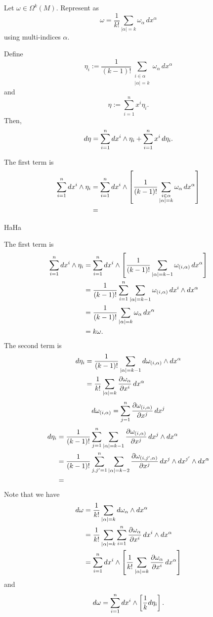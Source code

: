 \documentclass{../exp}
\begin{document}
\begin{pf}
Let $\omega\in\Omega^k(M)$.
Represent as
\[\omega=\frac1{k!}\sum_{|\alpha|=k}\omega_\alpha\,dx^\alpha\]
using multi-indices $\alpha$.

\clearpage
Define
\[\eta_i:=\frac1{(k-1)!}\sum_{\substack{i\in\alpha\\|\alpha|=k}}\omega_\alpha\,dx^\alpha\]
and
\[\eta:=\sum_{i=1}^nx^i\eta_i.\]
Then,
\[d\eta=\sum_{i=1}^ndx^i\wedge\eta_i+\sum_{i=1}^nx^i\,d\eta_i.\]

The first term is
\begin{align*}
\sum_{i=1}^ndx^i\wedge\eta_i
&=\sum_{i=1}^ndx^i\wedge\left[\frac1{(k-1)!}\sum_{\substack{i\in\alpha\\|\alpha|=k}}\omega_\alpha\,dx^\alpha\right]\\
&=
\end{align*}

HaHa

The first term is
\begin{align*}
\sum_{i=1}^ndx^i\wedge\eta_i
&=\sum_{i=1}^ndx^i\wedge\left[\frac1{(k-1)!}\sum_{|\alpha|=k-1}\omega_{(i,\alpha)}\,dx^\alpha\right]\\
&=\frac1{(k-1)!}\sum_{i=1}^n\sum_{|\alpha|=k-1}\omega_{(i,\alpha)}\,dx^i\wedge dx^\alpha\\
&=\frac1{(k-1)!}\sum_{|\alpha|=k}\omega_\alpha\,dx^\alpha\\
&=k\omega.
\end{align*}
The second term is
\begin{align*}
d\eta_i
&=\frac1{(k-1)!}\sum_{|\alpha|=k-1}d\omega_{(i,\alpha)}\wdg dx^\alpha\\
&=\frac1{k!}\sum_{|\alpha|=k}\pd{\omega_\alpha}{x^i}\,dx^\alpha
\end{align*}
\[d\omega_{(i,\alpha)}=\sum_{j=1}^n\pd{\omega_{(i,\alpha)}}{x^j}\,dx^j\]
\begin{align*}
d\eta_i
&=\frac1{(k-1)!}\sum_{j=1}^n\sum_{|\alpha|=k-1}\pd{\omega_{(i,\alpha)}}{x^j}\,dx^j\wdg dx^\alpha\\
&=\frac1{(k-1)!}\sum_{j,j'=1}^n\sum_{|\alpha|=k-2}\pd{\omega_{(i,j',\alpha)}}{x^j}\,dx^j\wdg dx^{j'}\wdg dx^\alpha\\
&=
\end{align*}
\clearpage
Note that we have
\begin{align*}
d\omega&=\frac1{k!}\sum_{|\alpha|=k}d\omega_{\alpha}\wdg dx^\alpha\\
&=\frac1{k!}\sum_{|\alpha|=k}\sum_{i=1}^n\pd{\omega_\alpha}{x^i}\,dx^i\wdg dx^\alpha\\
&=\sum_{i=1}^ndx^i\wdg\left[\frac1{k!}\sum_{|\alpha|=k}\pd{\omega_\alpha}{x^i}\,dx^\alpha\right]
\end{align*}
and
\[d\omega=\sum_{i=1}^ndx^i\wedge\left[\frac1kd\eta_i\right].\]


\end{pf}
\end{document}

